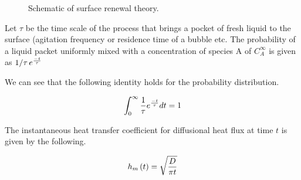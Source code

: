 \begin{figure}[h]
\begin{center}
\end{center}
\caption{Schematic of surface renewal theory.}
\label{surfacerenewaltheory}
\end{figure}

Let $\tau$ be the time scale of the process that brings a pocket of fresh liquid to the surface (agitation frequency or residence time of a bubble etc. The probability of a liquid packet uniformly mixed with a concentration of species A of $C_A^\infty$ is given as $ {1/\tau}\, e^{-t\over\tau} $

We can see that the following identity holds for the probability distribution.

$$ \int_{0}^{\infty}{ {1\over \tau} e^{-t\over \tau} dt} = 1 $$

The instantaneous heat transfer coefficient for diffusional heat flux at time $t$ is given by the following.

$$ h_m\left( t \right) = \sqrt{D \over \pi t} $$

